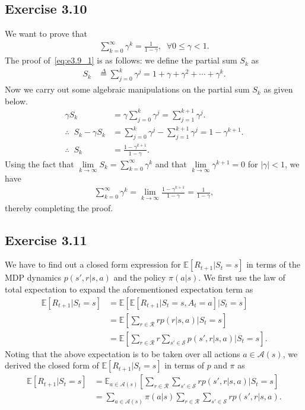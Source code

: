 \documentclass[10pt]{article}
\newcommand{\ldef}{\stackrel{\Delta}{=}}
\begin{document}
	\subsection*{Exercise 3.10}
	\label{ss:3.10}
	We want to prove that
	\begin{align}
	\sum_{k=0}^{\infty} \gamma^k = \frac{1}{1-\gamma}, \;\; \forall 0\leq\gamma<1.
	\label{eq:e3.9_1}
	\end{align}
	The proof of~\eqref{eq:e3.9_1} is as follows: we define the partial sum $S_k$ as 
	\begin{align*}
	S_k &\ldef \sum_{j=0}^{k} \gamma^j
	= 1 + \gamma + \gamma^2 + \cdots + \gamma^k.
	\end{align*}
	Now we carry out some algebraic manipulations on the partial sum $S_k$ as given below.
	\begin{align*}
	\gamma S_k &= \gamma \sum_{j=0}^k \gamma^j
	= \sum_{j=1}^{k+1} \gamma^j.\\
	\therefore \;\; S_k - \gamma S_k &= \sum_{j=0}^k \gamma^j - \sum_{j=1}^{k+1} \gamma^j
	= 1 - \gamma^{k+1}.\\
	\therefore \;\; S_k &= \frac{1 - \gamma^{k+1}}{1-\gamma}.
	\end{align*}
	Using the fact that $\lim\limits_{k\rightarrow\infty} S_k = \sum_{k=0}^{\infty} \gamma^k$ and that $\lim\limits_{k\rightarrow\infty} \gamma^{k+1} = 0$ for $|\gamma|<1$, we have
	\begin{align*}
	\sum_{k=0}^{\infty} \gamma^k = \lim\limits_{k\rightarrow\infty} \frac{1-\gamma^{k+1}}{1-\gamma} = \frac{1}{1-\gamma},
	\end{align*}
	thereby completing the proof.
	\subsection*{Exercise 3.11}
	\label{ss:3.11}
	We have to find out a closed form expression for $\mathbb{E} \left[ R_{t+1} | S_t = s \right]$ in terms of the MDP dynamics $p(s',r|s,a)$ and the policy $\pi(a|s)$. We first use the law of total expectation to expand the aforementioned expectation term as
	\begin{align*}
	\mathbb{E}\left[ R_{t+1} | S_t = s \right] &= \mathbb{E} \left[ \mathbb{E} \left[ R_{t+1} | S_t = s, A_t = a \right] | S_t = s\right]\\
	&= \mathbb{E} \left[ \sum_{r\in\mathcal{R}} r p(r | s,a) \big| S_t = s \right]\\
	&= \mathbb{E} \left[ \sum_{r\in\mathcal{R}} r \sum_{s'\in\mathcal{S}}p(s',r| s,a) \big| S_t = s \right].
	\end{align*}
	Noting that the above expectation is to be taken over all actions $a\in\mathcal{A}(s)$, we derived the closed form of $\mathbb{E}\left[ R_{t+1} | S_t = s \right]$ in terms of $p$ and $\pi$ as
	\begin{align*}
	\mathbb{E}\left[ R_{t+1} | S_t = s \right] &= \mathbb{E}_{a\in\mathcal{A}(s)} \left[ \sum_{r\in\mathcal{R}} 
	\sum_{s'\in\mathcal{S}} r p(s',r| s,a) \big| S_t = s \right]\\
	&= \sum_{a\in\mathcal{A}(s)} \pi(a|s) \sum_{r\in\mathcal{R}} 
	\sum_{s'\in\mathcal{S}} r p(s',r| s,a).
	\end{align*}
\end{document}
